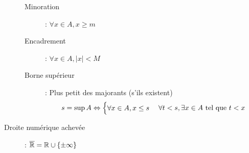 \begin{description}
\begin{description}
        \item[Minoration] : $\forall x\in A, x\ge m$
        \item[Encadrement] : $\forall x\in A, |x|< M$
        \item[Borne supérieur] : Plus petit des majorants (s'ils existent)
        \[
            s = \sup A\Leftrightarrow
            \begin{cases}
                \forall x\in A, x\le s\\
            \end{cases}
            \forall t<s, \exists x\in A\textrm{ tel que } t<x
        \]
        \end{description}
\item[Droite numérique achevée] : $\overline{\mathbb{R}}=\mathbb{R}\cup\{\pm\infty\}$
\end{description}